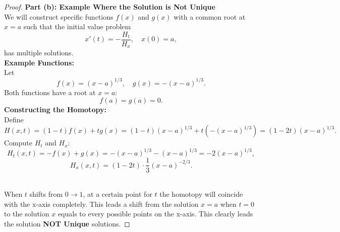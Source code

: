 \documentclass{article}
\begin{document}
\begin{proof}
    \textbf{Part (b): Example Where the Solution is Not Unique}
    \\
    We will construct specific functions \( f(x) \) and \( g(x) \) with a common root at \( x = a \) such that the initial value problem
    \[
        x'(t) = -\frac{H_t}{H_x}, \quad x(0) = a,
    \]
    has multiple solutions.
    \\
    \textbf{Example Functions:}
    \\
    Let
    \[
        f(x) = (x - a)^{1/3}, \quad g(x) = -(x - a)^{1/3}.
    \]
    Both functions have a root at \( x = a \):
    \[
        f(a) = g(a) = 0.
    \]
    \textbf{Constructing the Homotopy:}
    \\
    Define
    \[
        H(x, t) = (1 - t) f(x) + t g(x) = (1 - t)(x - a)^{1/3} + t ( - (x - a)^{1/3} ) = (1 - 2t)(x - a)^{1/3}.
    \]
    Compute \( H_t \) and \( H_x \):
    \[
        H_t(x, t) = -f(x) + g(x) = - (x - a)^{1/3} - (x - a)^{1/3} = -2 (x - a)^{1/3},
    \]
    \[
        H_x(x, t) = (1 - 2t) \cdot \frac{1}{3} (x - a)^{-2/3}.
    \]

    \\
    When $t$ shifts from $0 \to 1$, at a certain point for $t$ the homotopy will coincide with the x-axis completely. 
    This leads a shift from the solution $x=a$ when $t=0$ to the solution $x$ equals to every possible points on the x-axis.
    This clearly leads the solution \textbf{NOT Unique} solutions.

\end{proof}
\end{document}
